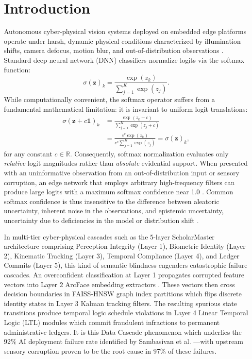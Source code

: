 \documentclass[conference]{IEEEtran}
\begin{document}
\section{Introduction}
Autonomous cyber-physical vision systems deployed on embedded edge platforms operate under harsh, dynamic physical conditions characterized by illumination shifts, camera defocus, motion blur, and out-of-distribution observations \cite{hendrycks2019benchmarking, dodge2016understanding}. Standard deep neural network (DNN) classifiers normalize logits via the softmax function:
\begin{equation}
\sigma(\mathbf{z})_k = \frac{\exp(z_k)}{\sum_{j=1}^K \exp(z_j)}.
\end{equation}
While computationally convenient, the softmax operator suffers from a fundamental mathematical limitation: it is invariant to uniform logit translations:
\begin{equation}
\begin{split}
\sigma(\mathbf{z} + c \mathbf{1})_k &= \frac{\exp(z_k + c)}{\sum_{j=1}^K \exp(z_j + c)} \\
&= \frac{e^c \exp(z_k)}{e^c \sum_{j=1}^K \exp(z_j)} = \sigma(\mathbf{z})_k,
\end{split}
\end{equation}
for any constant $c \in \mathbb{R}$. Consequently, softmax normalization evaluates only \textit{relative} logit magnitudes rather than \textit{absolute} evidential support. When presented with an uninformative observation from an out-of-distribution input or sensory corruption, an edge network that employs arbitrary high-frequency filters can produce large logits with a maximum softmax confidence near 1.0 \cite{guo2017calibration, nguyen2015deep}. Common softmax confidence is thus insensitive to the difference between aleatoric uncertainty, inherent noise in the observations, and epistemic uncertainty, uncertainty due to deficiencies in the model or distribution shift \cite{der2009aleatory, malinin2018predictive}.

In multi-tier cyber-physical cascades such as the 5-layer ScholarMaster architecture comprising Perception Integrity (Layer 1), Biometric Identity (Layer 2), Kinematic Tracking (Layer 3), Temporal Compliance (Layer 4), and Ledger Commits (Layer 5), this kind of semantic blindness engenders catastrophic failure cascades. An overconfident classification at Layer 1 propagates corrupted feature vectors into Layer 2 ArcFace embedding extractors \cite{deng2019arcface}. These vectors then cross decision boundaries in FAISS-HNSW graph index partitions \cite{malkov2018efficient} which flips discrete identity states in Layer 3 Kalman tracking filters. The resulting spurious state transitions produce temporal logic schedule violations in Layer 4 Linear Temporal Logic (LTL) modules \cite{pnueli1977temporal} which commit fraudulent infractions to permanent administrative ledgers. It is this Data Cascade phenomenon which underlies the 92\% AI deployment failure rate identified by Sambasivan et al. \cite{sambasivan2021everyone}---with upstream sensory corruption proven to be the root cause in 97\% of these failures.
\end{document}
